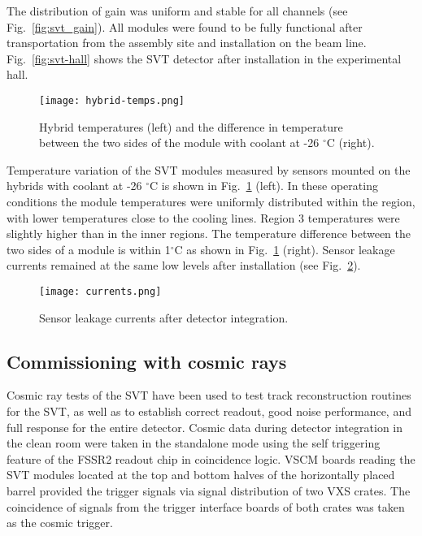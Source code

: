 The distribution of gain was uniform and stable for all channels (see Fig.~\ref{fig:svt_gain}). All modules were found to be fully functional after transportation from the assembly site and installation on the beam line. Fig.~\ref{fig:svt-hall} shows the SVT detector after installation in the experimental hall.

\begin{figure}[hbt] 
\centering 
\texttt{[image: hybrid-temps.png]}
\caption{Hybrid temperatures (left) and the difference in temperature between the two sides of the module with coolant at -26 $^\circ$C (right).}
\label{fig:hybrid-temps}
\end{figure}

Temperature variation of the SVT modules measured by sensors mounted on the hybrids with coolant at -26 $^\circ$C is shown in Fig.~\ref{fig:hybrid-temps} (left). In these operating conditions the module temperatures were uniformly distributed within the region, with lower temperatures close to the cooling lines. Region 3 temperatures were slightly higher than in the inner regions. The temperature difference between the two sides of a module is within 1$^\circ$C as shown in Fig.~\ref{fig:hybrid-temps} (right). Sensor leakage currents remained at the same low levels after installation (see Fig.~\ref{fig:currents}).

\begin{figure}[hbt] 
\centering 
\texttt{[image: currents.png]}
\caption{Sensor leakage currents after detector integration.}
\label{fig:currents}
\end{figure}

\subsection{Commissioning with cosmic rays}

Cosmic ray tests of the SVT have been used to test track reconstruction routines for the SVT, as well as to establish correct readout, good noise performance, and full response for the entire detector. Cosmic data during detector integration in the clean room were taken in the standalone mode using the self triggering feature of the FSSR2 readout chip in coincidence logic. VSCM boards reading the SVT modules located at the top and bottom halves of the horizontally placed barrel provided the trigger signals via signal distribution of two VXS crates. The coincidence of  signals from the trigger interface boards of both crates was taken as the cosmic trigger. 

